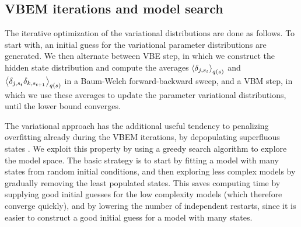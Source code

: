 \subsection{VBEM iterations and model search}
The iterative optimization of the variational distributions are done
as follows. To start with, an initial guess for the variational
parameter distributions are generated. We then alternate between VBE
step, in which we construct the hidden state distribution and compute
the averages $\left\langle \delta_{j,s_t}\right\rangle_{q(s)}$ and
$\left\langle \delta_{j,s_t}\delta_{k,s_{t+1}}\right\rangle_{q(s)}$ in a Baum-Welch
forward-backward sweep, and a VBM step, in which we use these averages
to update the parameter variational distributions, until the lower
bound converges.

The variational approach has the additional useful tendency to
penalizing overfitting already during the VBEM iterations, by
depopulating superfluous states
\cite{mackay1997,beal2003,persson2013}. We exploit this property by
using a greedy search algorithm to explore the model space. The basic
strategy is to start by fitting a model with many states from random
initial conditions, and then exploring less complex models by
gradually removing the least populated states. This saves computing
time by supplying good initial guesses for the low complexity models
(which therefore converge quickly), and by lowering the number of
independent restarts, since it is easier to construct a good initial
guess for a model with many states.

